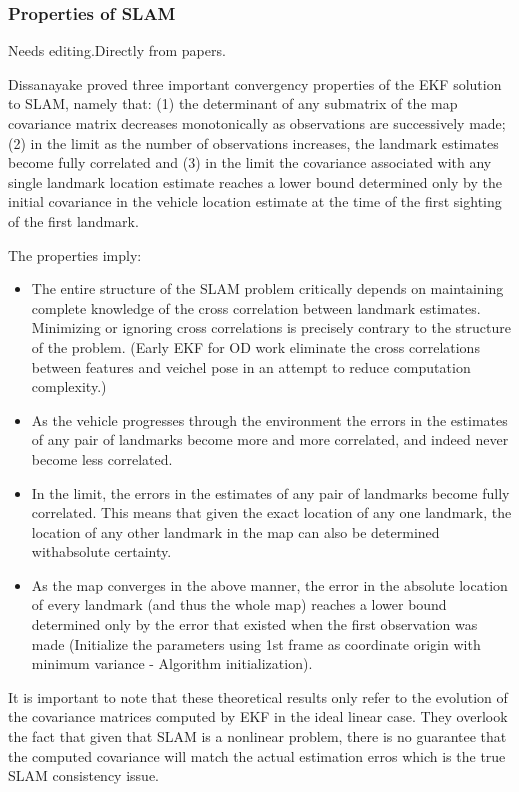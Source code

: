 \subsubsection{Properties of SLAM}
\label{sec:SLAM_properties}

Needs editing.Directly from papers.

Dissanayake proved three important convergency properties of the EKF 
solution to SLAM, namely that: (1) the determinant of any submatrix of 
the map covariance matrix decreases monotonically as observations are 
successively made; (2) in the limit as the number of observations 
increases, the landmark estimates become fully correlated and (3) in the 
limit the covariance associated with any single landmark location 
estimate reaches a lower bound determined only by the initial covariance 
in the vehicle location estimate at the time of the first sighting of 
the first landmark.

The properties imply:

\begin{itemize}
  \item The entire structure of the SLAM problem critically depends on 
  maintaining complete knowledge of the cross correlation between landmark 
  estimates. Minimizing or ignoring cross correlations is precisely 
  contrary to the structure of the problem. (Early EKF for OD work 
  eliminate the cross correlations between features and veichel pose in an 
  attempt to reduce computation complexity.)
  \item As the vehicle progresses through the environment the errors in 
  the estimates of any pair of landmarks become more and more correlated, 
  and indeed never become less correlated.
  \item In the limit, the errors in the estimates of any pair of landmarks 
  become fully correlated. This means that given the exact location of any 
  one landmark, the location of any other landmark in the map can also be 
  determined withabsolute certainty.
  \item As the map converges in the above manner, the error in the 
  absolute location of every landmark (and thus the whole map) reaches a 
  lower bound determined only by the error that existed when the first 
  observation was made (Initialize the parameters using 1st frame as 
  coordinate origin with minimum variance - Algorithm initialization).
\end{itemize}
It is important to note that these theoretical results only refer to the 
evolution of the covariance matrices computed by EKF in the ideal linear 
case. They overlook the fact that given that SLAM is a nonlinear 
problem, there is no guarantee that the computed covariance will match 
the actual estimation erros which is the true SLAM consistency issue. 

